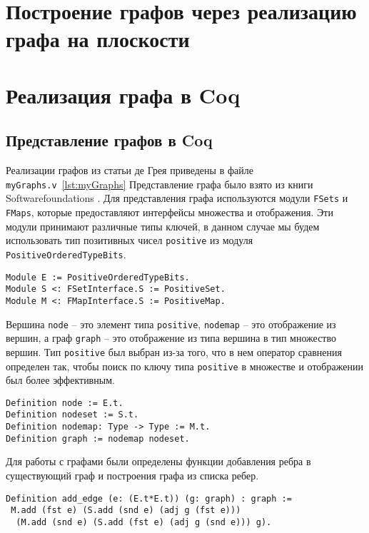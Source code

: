 

\chapter{Построение графов через реализацию графа на плоскости}

\chapter{Реализация графа в Coq}

\section{Представление графов в Coq}
Реализации графов из статьи де Грея приведены в файле {\tt myGraphs.v}~\ref{lst:myGraphs}
Представление графа было взято из книги Softwarefoundations \cite{VFA}.
Для представления графа используются модули {\tt FSets} и {\tt FMaps}, которые предоставляют интерфейсы множества и отображения. Эти модули принимают различные типы ключей, в данном случае мы будем использовать тип позитивных чисел {\tt positive} из модуля {\tt PositiveOrderedTypeBits}.

\begin{verbatim}
Module E := PositiveOrderedTypeBits.
Module S <: FSetInterface.S := PositiveSet.
Module M <: FMapInterface.S := PositiveMap.
\end{verbatim} 

Вершина {\tt node} -- это элемент типа {\tt positive}, {\tt nodemap} -- это отображение из вершин, а граф {\tt graph} -- это отображение из типа вершина в тип множество вершин. Тип {\tt positive} был выбран из-за того, что в нем оператор сравнения определен так, чтобы поиск по ключу типа {\tt positive} в множестве и отображении был более эффективным.

\begin{verbatim}
Definition node := E.t.
Definition nodeset := S.t.
Definition nodemap: Type -> Type := M.t.
Definition graph := nodemap nodeset.
\end{verbatim}

Для работы с графами были определены функции добавления ребра в существующий граф и построения графа из списка ребер.

\begin{verbatim}
Definition add_edge (e: (E.t*E.t)) (g: graph) : graph :=
 M.add (fst e) (S.add (snd e) (adj g (fst e))) 
  (M.add (snd e) (S.add (fst e) (adj g (snd e))) g).
\end{verbatim}

